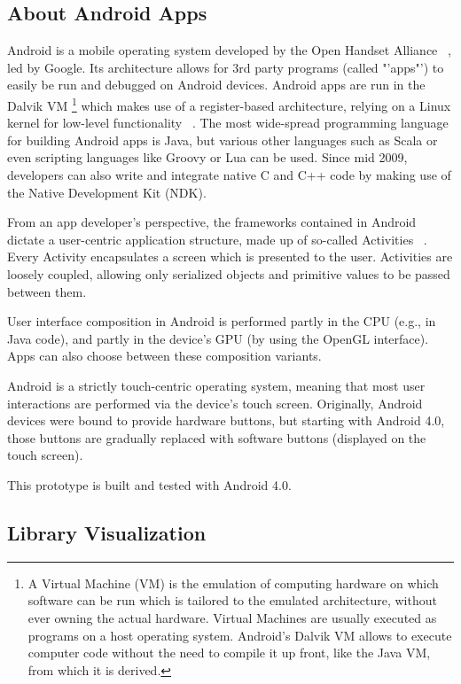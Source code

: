 \subsection{About Android Apps}

Android is a mobile operating system developed by the Open Handset Alliance ~\cite{url:openhandsetalliance}, led by Google. Its architecture allows for 3rd party programs (called "'apps"') to easily be run and debugged on Android devices.
Android apps are run in the Dalvik VM \footnote{A Virtual Machine (VM) is the emulation of computing hardware on which software can be run which is tailored to the emulated architecture, without ever owning the actual hardware. Virtual Machines are usually executed as programs on a host operating system. Android's Dalvik VM allows to execute computer code without the need to compile it up front, like the Java VM, from which it is derived.} which makes use of a register-based architecture, relying on a Linux kernel for low-level functionality ~\cite{dalvik}. The most wide-spread programming language for building Android apps is Java, but various other languages such as Scala or even scripting languages like Groovy or Lua can be used. Since mid 2009, developers can also write and integrate native C and C++ code by making use of the Native Development Kit (NDK).

From an app developer's perspective, the frameworks contained in Android dictate a user-centric application structure, made up of so-called Activities ~\cite{url:androidactivity}. Every Activity encapsulates a screen which is presented to the user. Activities are loosely coupled, allowing only serialized objects and primitive values to be passed between them.

User interface composition in Android is performed partly in the CPU (e.g., in Java code), and partly in the device's GPU (by using the OpenGL interface). Apps can also choose between these composition variants.

Android is a strictly touch-centric operating system, meaning that most user interactions are performed via the device's touch screen. Originally, Android devices were bound to provide hardware buttons, but starting with Android 4.0, those buttons are gradually replaced with software buttons (displayed on the touch screen).

This prototype is built and tested with Android 4.0.

\subsection{Library Visualization}
\label{subsec:libraryvis}

